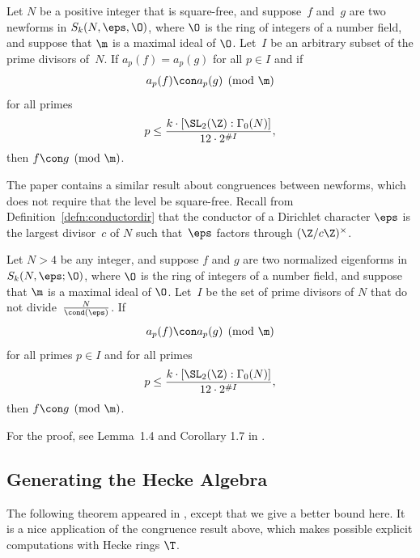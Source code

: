 \begin{theorem}[Sturm]
Let $N$ be a positive integer that is square-free, and 
suppose~$f$ and~$g$ are two newforms in 
$S_k(N,\eps,\O)$,
where $\O$ is the ring of integers of a number field, 
and suppose that $\m$ is a maximal ideal of $\O$.
Let~$I$ be an arbitrary subset of the prime divisors of~$N$.
If 
$
 a_p(f) = a_p(g)
$
for all $p\in I$ and if
$$
 a_p(f) \con a_p(g)\pmod{\m}
$$
for all primes 
$$
  p \leq \frac{k\cdot [\SL_2(\Z):\Gamma_0(N)]}{12 \cdot 2^{\#I}},
$$ 
then $f\con g\pmod{\m}$.
\end{theorem}


The paper \cite{buzzard-stein:artin} contains a similar  result about
congruences between newforms, which does not require that the level be
square-free.  Recall from Definition~\ref{defn:conductordir} that the
conductor of a Dirichlet character $\eps$ is the largest divisor~$c$
of $N$ such that~$\eps$ factors through $(\Z/c\Z)^\times$.

\begin{theorem}
Let $N>4$ be any integer, and
suppose $f$ and $g$ are two normalized eigenforms in $S_k(N,\eps;\O)$,
where $\O$ is the ring of integers of a number field, 
and suppose that $\m$ is a maximal ideal of $\O$.
Let~$I$ be the set of prime divisors of $N$ that
do not divide~$\frac{N}{\cond(\eps)}$.
If 
$$
a_p(f) \con a_p(g)\pmod{\m}
$$
for all primes $p\in I$ and for all primes
$$
  p \leq \frac{k\cdot [\SL_2(\Z):\Gamma_0(N)]}{12 \cdot 2^{\#I}},
$$ 
then $f\con g\pmod{\m}$.
\end{theorem}
For the proof, see Lemma~1.4 and Corollary 1.7 in \cite[\S1.3]{buzzard-stein:artin}.




\subsection{Generating the Hecke Algebra}

The following theorem appeared in \cite[Appendix]{lario-schoof}, except that
we give a better bound here.  It is a nice application of the
congruence result above, which makes possible explicit computations
with Hecke rings $\T$.

